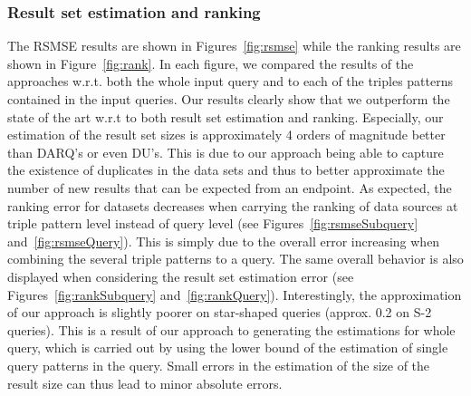 \documentclass{sig-alternate}  %
\begin{document}
\subsubsection{Result set estimation and ranking}
The RSMSE results are shown in Figures~\ref{fig:rsmse} while the ranking results are shown in Figure~\ref{fig:rank}.
In each figure, we compared the results of the approaches w.r.t. both the whole input query and to each of the triples patterns contained in the input queries.
Our results clearly show that we outperform the state of the art w.r.t to both result set estimation and ranking.
Especially, our estimation of the result set sizes is approximately 4 orders of magnitude better than DARQ's or even DU's. 
This is due to our approach being able to capture the existence of duplicates in the data sets and thus to better approximate the number of new results that can be expected from  an endpoint.
As expected, the ranking error for datasets decreases when carrying the ranking of data sources at triple pattern level instead of query level (see Figures~\ref{fig:rsmseSubquery} and~\ref{fig:rsmseQuery}).
This is simply due to the overall error increasing when combining the several triple patterns to a query.
The same overall behavior is also displayed when considering the result set estimation error (see Figures~\ref{fig:rankSubquery} and~\ref{fig:rankQuery}). 
Interestingly, the approximation of our approach is slightly poorer on star-shaped queries (approx. 0.2 on S-2 queries).
This is a result of our approach to generating the estimations for whole query, which is carried out by using the lower bound of the estimation of single query patterns in the query. 
Small errors in the estimation of the size of the result size can thus lead to minor absolute errors.
\end{document}
